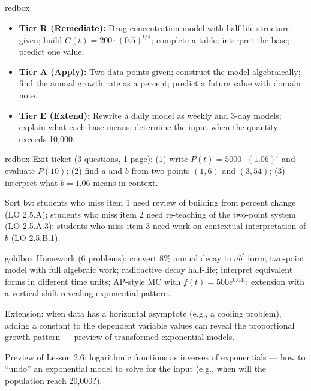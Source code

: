 \documentclass[10pt]{article}
\begin{document}
\begin{skillbox}{redbox}
\begin{itemize}[leftmargin=1.2em,itemsep=2pt,topsep=0pt]
  \item \textbf{Tier R (Remediate):} Drug concentration model with half-life structure given; build
        $C(t) = 200 \cdot (0.5)^{t/4}$; complete a table; interpret the base; predict one value.
  \item \textbf{Tier A (Apply):} Two data points given; construct the model algebraically; find the
        annual growth rate as a percent; predict a future value with domain note.
  \item \textbf{Tier E (Extend):} Rewrite a daily model as weekly and 3-day models; explain what each
        base means; determine the input when the quantity exceeds 10{,}000.
\end{itemize}
\end{skillbox}

\begin{skillbox}{redbox}
Exit ticket (3 questions, 1 page): (1) write $P(t) = 5000 \cdot (1.06)^t$ and evaluate $P(10)$;
(2) find $a$ and $b$ from two points $(1, 6)$ and $(3, 54)$;
(3) interpret what $b = 1.06$ means in context.

Sort by: students who miss item 1 need review of building from percent change (LO 2.5.A);
students who miss item 2 need re-teaching of the two-point system (LO 2.5.A.3);
students who miss item 3 need work on contextual interpretation of $b$ (LO 2.5.B.1).
\end{skillbox}

\begin{skillbox}{goldbox}
Homework (6 problems): convert 8\% annual decay to $ab^t$ form; two-point model with full
algebraic work; radioactive decay half-life; interpret equivalent forms in different time units;
AP-style MC with $f(t) = 500e^{0.04t}$; extension with a vertical shift revealing exponential pattern.

Extension: when data has a horizontal asymptote (e.g., a cooling problem), adding a constant to
the dependent variable values can reveal the proportional growth pattern --- preview of transformed
exponential models.

Preview of Lesson 2.6: logarithmic functions as inverses of exponentials --- how to ``undo'' an
exponential model to solve for the input (e.g., when will the population reach 20{,}000?).
\end{skillbox}
\end{document}
